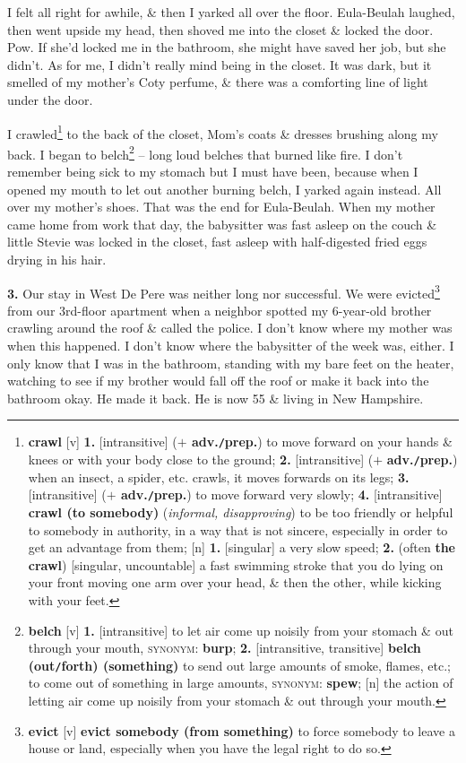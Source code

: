 \documentclass[oneside]{book}
\numberwithin{equation}{section}
\begin{document}
I felt all right for awhile, \& then I yarked all over the floor. Eula-Beulah laughed, then went upside my head, then shoved me into the closet \& locked the door. Pow. If she'd locked me in the bathroom, she might have saved her job, but she didn't. As for me, I didn't really mind being in the closet. It was dark, but it smelled of my mother's Coty perfume, \& there was a comforting line of light under the door.

I crawled\footnote{\textbf{crawl} [v] \textbf{1.} [intransitive] (\textbf{$+$ adv.\texttt{/}prep.}) to move forward on your hands \& knees or with your body close to the ground; \textbf{2.} [intransitive] ($+$ \textbf{adv.\texttt{/}prep.}) when an insect, a spider, etc. crawls, it moves forwards on its legs; \textbf{3.} [intransitive] (\textbf{$+$ adv.\texttt{/}prep.}) to move forward very slowly; \textbf{4.} [intransitive] \textbf{crawl (to somebody)} (\textit{informal, disapproving}) to be too friendly or helpful to somebody in authority, in a way that is not sincere, especially in order to get an advantage from them; [n] \textbf{1.} [singular] a very slow speed; \textbf{2.} (often \textbf{the crawl}) [singular, uncountable] a fast swimming stroke that you do lying on your front moving one arm over your head, \& then the other, while kicking with your feet.} to the back of the closet, Mom's coats \& dresses brushing along my back. I began to belch\footnote{\textbf{belch} [v] \textbf{1.} [intransitive] to let air come up noisily from your stomach \& out through your mouth, \textsc{synonym}: \textbf{burp}; \textbf{2.} [intransitive, transitive] \textbf{belch (out\texttt{/}forth) (something)} to send out large amounts of smoke, flames, etc.; to come out of something in large amounts, \textsc{synonym}: \textbf{spew}; [n] the action of letting air come up noisily from your stomach \& out through your mouth.} -- long loud belches that burned like fire. I don't remember being sick to my stomach but I must have been, because when I opened my mouth to let out another burning belch, I yarked again instead. All over my mother's shoes. That was the end for Eula-Beulah. When my mother came home from work that day, the babysitter was fast asleep on the couch \& little Stevie was locked in the closet, fast asleep with half-digested fried eggs drying in his hair.

\textbf{3.} Our stay in West De Pere was neither long nor successful. We were evicted\footnote{\textbf{evict} [v] \textbf{evict somebody (from something)} to force somebody to leave a house or land, especially when you have the legal right to do so.} from our 3rd-floor apartment when a neighbor spotted my 6-year-old brother crawling around the roof \& called the police. I don't know where my mother was when this happened. I don't know where the babysitter of the week was, either. I only know that I was in the bathroom, standing with my bare feet on the heater, watching to see if my brother would fall off the roof or make it back into the bathroom okay. He made it back. He is now 55 \& living in New Hampshire.
\end{document}
